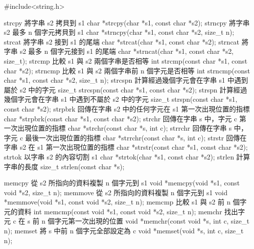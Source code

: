 #include<string.h>

strcpy	將字串 s2 拷貝到 s1	char *strcpy(char *s1, const char *s2);
strncpy	將字串 s2 最多 n 個字元拷貝到 s1	char *strncpy(char *s1, const char *s2, size_t n);
strcat	將字串 s2 接到 s1 的尾端	char *strcat(char *s1, const char *s2);
strncat	將字串 s2 最多 n 個字元接到 s1 的尾端	char *strncat(char *s1, const char *s2, size_t);
strcmp	比較 s1 與 s2 兩個字串是否相等	int strcmp(const char *s1, const char *s2);
strncmp	比較 s1 與 s2 兩個字串前 n 個字元是否相等	int strncmp(const char *s1, const char *s2, size_t n);
strcspn	計算經過幾個字元會在字串 s1 中遇到屬於 s2 中的字元	size_t strcspn(const char *s1, const char *s2);
strspn	計算經過幾個字元會在字串 s1 中遇到不屬於 s2 中的字元	size_t strspn(const char *s1, const char *s2);
strpbrk	回傳在字串 s2 中的任何字元在 s1 第一次出現位置的指標	char *strpbrk(const char *s1, const char *s2);
strchr	回傳在字串 s 中，字元 c 第一次出現位置的指標	char *strchr(const char *s, int c);
strrchr	回傳在字串 s 中，字元 c 最後一次出現位置的指標	char *strrchr(const char *s, int c);
strstr	回傳在字串 s2 在 s1 第一次出現位置的指標	char *strstr(const char *s1, const char *s2);
strtok	以字串 s2 的內容切割 s1	char *strtok(char *s1, const char *s2);
strlen	計算字串的長度	size_t strlen(const char *s);

memcpy	從 s2 所指向的資料複製 n 個字元到 s1	void *memcpy(void *s1, const void *s2, size_t n);
memmove	從 s2 所指向的資料複製 n 個字元到 s1	void *memmove(void *s1, const void *s2, size_t n);
memcmp	比較 s1 與 s2 前 n 個字元的資料	int memcmp(const void *s1, const void *s2, size_t n);
memchr	找出字元 c 在 s 前 n 個字元第一次出現的位置	void *memchr(const void *s, int c, size_t n);
memset	將 s 中前 n 個字元全部設定為 c	void *memset(void *s, int c, size_t n);
